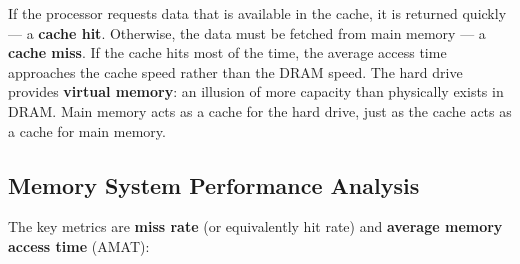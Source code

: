 \documentclass[9pt, a4paper]{extarticle}
\begin{document}
\begin{table}[htbp]
\centering\small
{}
\caption{Memory hierarchy (after Harris Figure~8.3, Table~8.1). Each level is roughly 10$\times$ slower and 10--30$\times$ cheaper per GB than the one above. The processor seeks data in the cache first; on a miss, it falls through to main memory, then to disk.}
\label{fig:mem-hierarchy}
\end{table}

If the processor requests data that is available in the cache, it is returned quickly --- a \textbf{cache hit}. Otherwise, the data must be fetched from main memory --- a \textbf{cache miss}. If the cache hits most of the time, the average access time approaches the cache speed rather than the DRAM speed. The hard drive provides \textbf{virtual memory}: an illusion of more capacity than physically exists in DRAM. Main memory acts as a cache for the hard drive, just as the cache acts as a cache for main memory.

\subsection{Memory System Performance Analysis}

The key metrics are \textbf{miss rate} (or equivalently hit rate) and \textbf{average memory access time} (AMAT):
\end{document}
